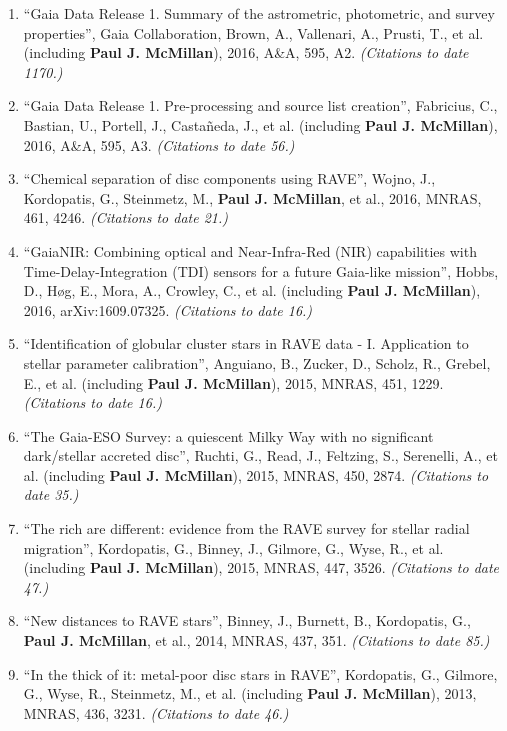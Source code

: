 \documentclass{resume}
\begin{document}
\begin{enumerate}
\item ``Gaia Data Release 1. Summary of the astrometric, photometric, and survey properties'', Gaia Collaboration, Brown, A., Vallenari, A., Prusti, T., et al. (including \textbf{Paul J. McMillan}), 2016, A\&A, 595, A2. \textit{(Citations to date 1170.)}

\item ``Gaia Data Release 1. Pre-processing and source list creation'', Fabricius, C., Bastian, U., Portell, J., Casta\~neda, J., et al. (including \textbf{Paul J. McMillan}), 2016, A\&A, 595, A3. \textit{(Citations to date 56.)}

\item ``Chemical separation of disc components using RAVE'', Wojno, J., Kordopatis, G., Steinmetz, M., \textbf{Paul J. McMillan}, et al., 2016, MNRAS, 461, 4246. \textit{(Citations to date 21.)}

\item ``GaiaNIR: Combining optical and Near-Infra-Red (NIR) capabilities with Time-Delay-Integration (TDI) sensors for a future Gaia-like mission'', Hobbs, D., H{\o}g, E., Mora, A., Crowley, C., et al. (including \textbf{Paul J. McMillan}), 2016, arXiv:1609.07325. \textit{(Citations to date 16.)}

\item ``Identification of globular cluster stars in RAVE data - I. Application to stellar parameter calibration'', Anguiano, B., Zucker, D., Scholz, R., Grebel, E., et al. (including \textbf{Paul J. McMillan}), 2015, MNRAS, 451, 1229. \textit{(Citations to date 16.)}

\item ``The Gaia-ESO Survey: a quiescent Milky Way with no significant dark/stellar accreted disc'', Ruchti, G., Read, J., Feltzing, S., Serenelli, A., et al. (including \textbf{Paul J. McMillan}), 2015, MNRAS, 450, 2874. \textit{(Citations to date 35.)}

\item ``The rich are different: evidence from the RAVE survey for stellar radial migration'', Kordopatis, G., Binney, J., Gilmore, G., Wyse, R., et al. (including \textbf{Paul J. McMillan}), 2015, MNRAS, 447, 3526. \textit{(Citations to date 47.)}

\item ``New distances to RAVE stars'', Binney, J., Burnett, B., Kordopatis, G., \textbf{Paul J. McMillan}, et al., 2014, MNRAS, 437, 351. \textit{(Citations to date 85.)}

\item ``In the thick of it: metal-poor disc stars in RAVE'', Kordopatis, G., Gilmore, G., Wyse, R., Steinmetz, M., et al. (including \textbf{Paul J. McMillan}), 2013, MNRAS, 436, 3231. \textit{(Citations to date 46.)}


\end{enumerate}
\end{document}
